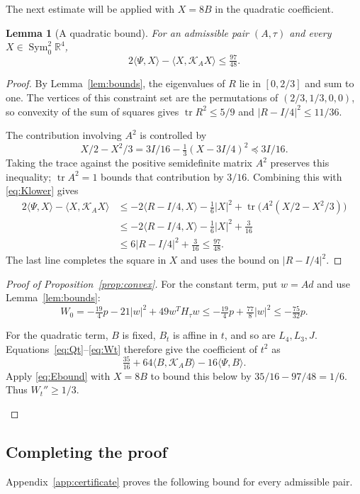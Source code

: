 \documentclass[11pt,a4paper]{amsart}
\numberwithin{equation}{section}
\newtheorem{lemma}[theorem]{Lemma}
\theoremstyle{definition}
\theoremstyle{remark}
\DeclareMathOperator{\tr}{tr}
\newcommand{\R}{\mathbb R}
\newcommand{\K}{\mathcal K}
\newcommand{\Szero}{\operatorname{Sym}^2_0\R^4}
\begin{document}
The next estimate will be applied with $X=8B$ in the quadratic coefficient.

\begin{lemma}[A quadratic bound]\label{lem:Ebound}
For an admissible pair $(A,\tau)$ and every $X\in\Szero$,
\begin{equation}\label{eq:Ebound}
 2\langle \Psi,X\rangle-\langle X,\K_AX\rangle\le\tfrac{97}{48}.
\end{equation}
\end{lemma}
\begin{proof}
By Lemma~\ref{lem:bounds}, the eigenvalues of $R$ lie in $[0,2/3]$
and sum to one. The vertices of this constraint set are the permutations
of $(2/3,1/3,0,0)$, so convexity of the sum of squares gives
$\tr R^2\le5/9$ and $|R-I/4|^2\le11/36$.

The contribution involving $A^2$ is controlled by
\[
 X/2-X^2/3=3I/16-\tfrac13(X-3I/4)^2\preceq3I/16.
\]
Taking the trace against the positive semidefinite matrix $A^2$
preserves this inequality; $\tr A^2=1$ bounds that contribution by
$3/16$. Combining this with \eqref{eq:Klower} gives
\begin{align*}
 2\langle \Psi,X\rangle-\langle X,\K_AX\rangle
 &\le-2\langle R-I/4,X\rangle-\tfrac16|X|^2
       +\tr\bigl(A^2(X/2-X^2/3)\bigr)\\
 &\le-2\langle R-I/4,X\rangle-\tfrac16|X|^2+\tfrac3{16}\\
 &\le6|R-I/4|^2+\tfrac3{16}\le\tfrac{97}{48}.
\end{align*}
The last line completes the square in $X$ and uses the bound on
$|R-I/4|^2$.
\end{proof}

\begin{proof}[Proof of Proposition~\ref{prop:convex}]
For the constant term, put $w=Ad$ and use Lemma~\ref{lem:bounds}:
\[
 W_0=-\tfrac{19}{4}p-21|w|^2+49w^TH_\tau w
     \le-\tfrac{19}{4}p+\tfrac{77}{8}|w|^2
     \le-\tfrac{75}{32}p.
\]
\begin{samepage}
For the quadratic term, $B$ is fixed, $B_t$ is affine in $t$,
and so are $L_4,L_3,J$. Equations~\eqref{eq:Qt}--\eqref{eq:Wt}
therefore give the coefficient of $t^2$ as
\[
 \tfrac{35}{16}+64\langle B,\K_AB\rangle
                    -16\langle \Psi,B\rangle.
\]
Apply \eqref{eq:Ebound} with $X=8B$ to bound this below by
$35/16-97/48=1/6$. Thus $W_t''\ge1/3$.
\end{samepage}
\end{proof}

\subsection{Completing the proof}
Appendix~\ref{app:certificate} proves the following bound for every
admissible pair.
\end{document}

